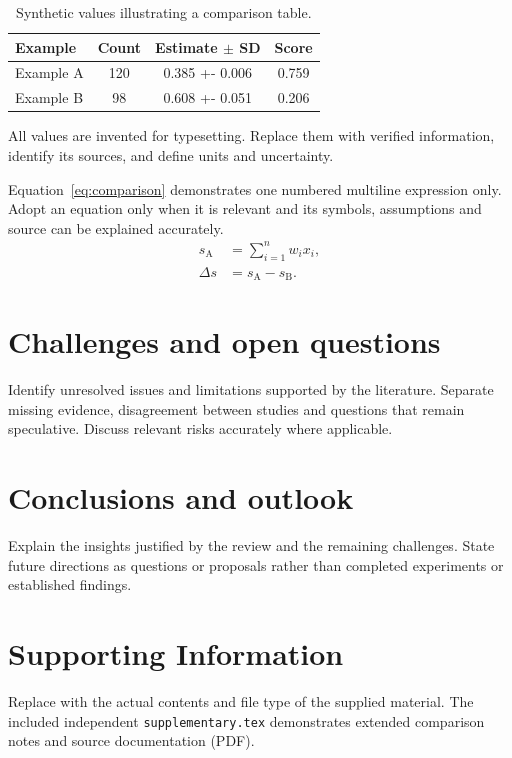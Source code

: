 \documentclass[letterpaper,11pt]{article}
\begin{document}
\begin{table}[htbp]
\centering\small
\caption{Synthetic values illustrating a comparison table.}
\label{tab:comparison}
\begin{tabularx}{\linewidth}{@{}>{\raggedright\arraybackslash}X
 S[table-format=3.0] S[table-format=1.3(3)] S[table-format=1.3]@{}}
\toprule
Example & {Count} & {Estimate $\pm$ SD} & {Score}\\
\midrule
Example A & 120 & 0.385 +- 0.006 & 0.759\\
Example B & 98 & 0.608 +- 0.051 & 0.206\\
\bottomrule
\end{tabularx}
\par\smallskip\footnotesize\raggedright
All values are invented for typesetting. Replace them with verified
information, identify its sources, and define units and uncertainty.
\end{table}

Equation~\eqref{eq:comparison} demonstrates one numbered multiline expression
only. Adopt an equation only when it is relevant and its symbols, assumptions
and source can be explained accurately.
\begin{equation}
\begin{split}
 s_{\mathrm{A}} &= \sum_{i=1}^{n} w_i x_i,\\
 \Delta s &= s_{\mathrm{A}}-s_{\mathrm{B}}.
\end{split}\label{eq:comparison}
\end{equation}

\section{Challenges and open questions}\label{sec:challenges}
Identify unresolved issues and limitations supported by the literature.
Separate missing evidence, disagreement between studies and questions that
remain speculative. Discuss relevant risks accurately where applicable.

\section{Conclusions and outlook}\label{sec:outlook}
Explain the insights justified by the review and the remaining challenges.
State future directions as questions or proposals rather than completed
experiments or established findings.

\section*{Supporting Information}
Replace with the actual contents and file type of the supplied material.
The included independent \texttt{supplementary.tex} demonstrates extended
comparison notes and source documentation (PDF).
\end{document}
